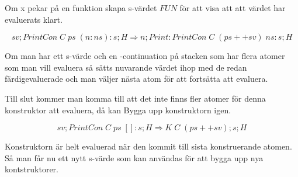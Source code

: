 \documentclass[../Core]{subfiles}
\begin{document}
Om x pekar på en funktion skapa s-värdet $FUN$ för att visa att att värdet har
evaluerats klart. 


\[
sv ; PrintCon \; C \; ps \; (n : ns) : s ; H
\Rightarrow n ; Print : PrintCon \; C \; (ps ++ sv) \; ns : s ; H
\]

Om man har ett s-värde och en -continuation på stacken som har flera
atomer som man vill evaluera så sätts nuvarande värdet ihop med de redan färdigevaluerade
och man väljer nästa atom för att fortsätta att evaluera.

Till slut kommer man komma till att det inte finns fler atomer för denna konstruktor
att evaluera, då kan Bygga upp konstruktorn igen.

\[
sv ; PrintCon \; C \; ps \; [] : s ; H
\Rightarrow K \; C \; (ps ++ sv) ; s ; H
\]

Konstruktorn är helt evaluerad när den kommit till sista konstruerande atomen. Så
man får nu ett nytt s-värde som kan användas för att bygga upp nya kontstruktorer.
\end{document}
